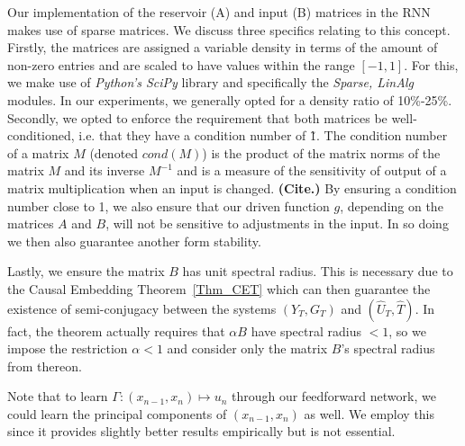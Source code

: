 Our implementation of the reservoir (A) and input (B) matrices in the RNN makes use of sparse matrices. We discuss three specifics relating to this concept. Firstly, the matrices are assigned a variable density in terms of the amount of non-zero entries and are scaled to have values within the range $[-1,1]$. For this, we make use of \textit{Python's SciPy} library and specifically the \textit{Sparse, LinAlg} modules. In our experiments, we generally opted for a density ratio of 10\%-25\%.
Secondly, we opted to enforce the requirement that both matrices be well-conditioned, i.e. that they have a condition number of \~1. The condition number of a matrix $M$ (denoted $cond(M)$) is the product of the matrix norms of the matrix $M$ and its inverse $M^{-1}$ and is a measure of the sensitivity of output of a matrix multiplication when an input is changed. \textbf{(Cite.)} By ensuring a condition number close to 1, we also ensure that our driven function $g$, depending on the matrices $A$ and $B$, will not be sensitive to adjustments in the input. In so doing we then also guarantee another form stability. 

Lastly, we ensure the matrix $B$ has unit spectral radius. This is necessary due to the Causal Embedding Theorem~\ref{Thm_CET} which can then guarantee the existence of semi-conjugacy between the systems $(Y_T, G_T)$ and $(\widehat{U}_T, \widehat{T})$. In fact, the theorem actually requires that $\alpha{B}$ have spectral radius $<1$, so we impose the restriction $\alpha<1$ and consider only the matrix $B$'s spectral radius from thereon.


Note that to learn $\Gamma: (x_{n-1},x_{n}) \mapsto u_n$ through our feedforward network, we could learn the principal components of $(x_{n-1},x_{n})$ as well. 
We employ this since it provides slightly better results empirically but is not essential.

